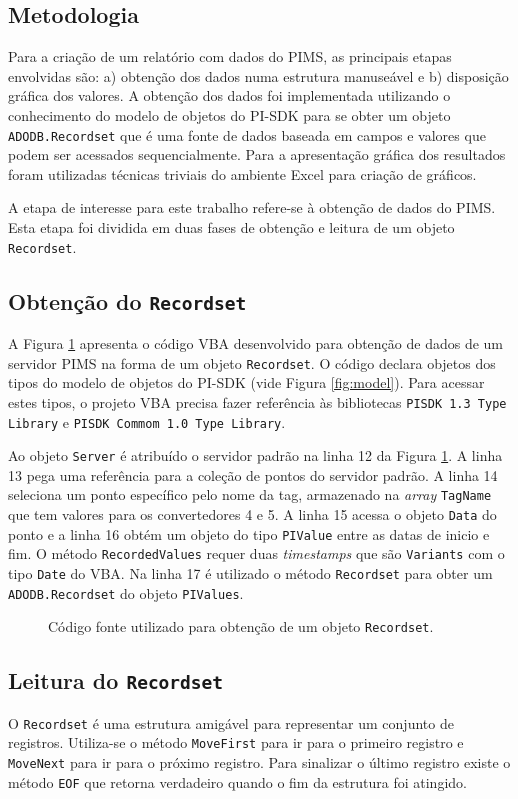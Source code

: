 \begin{multicols}{2}
\section{Metodologia}
	Para a criação de um relatório com dados do PIMS, as principais etapas envolvidas são: a) obtenção dos dados numa estrutura manuseável e b) disposição gráfica dos valores. A obtenção dos dados foi implementada utilizando o conhecimento do modelo de objetos do PI-SDK para se obter um objeto \texttt{ADODB.Recordset} que é uma fonte de dados baseada em campos e valores que podem ser acessados sequencialmente. Para a apresentação gráfica dos resultados foram utilizadas técnicas triviais do ambiente Excel para criação de gráficos.
	
	A etapa de interesse para este trabalho refere-se à obtenção de dados do PIMS. Esta etapa foi dividida em duas fases de obtenção e leitura de um objeto \texttt{Recordset}.
\subsection{Obtenção do \texttt{Recordset}}
	A Figura \ref{fig:code} apresenta o código VBA desenvolvido para obtenção de dados de um servidor PIMS na forma de um objeto \texttt{Recordset}. O código declara objetos dos tipos do modelo de objetos do PI-SDK (vide Figura \ref{fig:model}). Para acessar estes tipos, o projeto VBA precisa fazer referência às bibliotecas \texttt{PISDK 1.3 Type Library} e \texttt{PISDK Commom 1.0 Type Library}.
	
	Ao objeto \texttt{Server} é atribuído o servidor padrão na linha 12 da Figura \ref{fig:code}. A linha 13 pega uma referência para a coleção de pontos do servidor padrão. A linha 14 seleciona um ponto específico pelo nome da tag, armazenado na \emph{array} \texttt{TagName} que tem valores para os convertedores 4 e 5. A linha 15 acessa o objeto \texttt{Data} do ponto e a linha 16 obtém um objeto do tipo \texttt{PIValue} entre as datas de inicio e fim. O método \texttt{RecordedValues} requer duas \emph{timestamps} que são \texttt{Variants} com o tipo \texttt{Date} do VBA. Na linha 17 é utilizado o método \texttt{Recordset} para obter um \texttt{ADODB.Recordset} do objeto \texttt{PIValues}.
	\begin{figure}[H]
		\centering
		
		\caption{Código fonte utilizado para obtenção de um objeto \texttt{Recordset}.}
		\label{fig:code}
	\end{figure}			
\subsection{Leitura do \texttt{Recordset}}
	O \texttt{Recordset} é uma estrutura amigável para representar um conjunto de registros. Utiliza-se o método \texttt{MoveFirst} para ir para o primeiro registro e \texttt{MoveNext} para ir para o próximo registro. Para sinalizar o último registro existe o método \texttt{EOF} que retorna verdadeiro quando o fim da estrutura foi atingido. 
	

\end{multicols}

